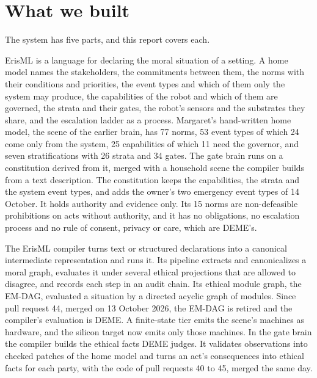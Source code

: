 \section{What we built}

The system has five parts, and this report covers each.

ErisML is a language for declaring the moral situation of a setting. A home model names the
stakeholders, the commitments between them, the norms with their conditions and priorities, the event
types and which of them only the system may produce, the capabilities of the robot and which of
them are governed, the strata and their gates, the robot's sensors and the substrates they share,
and the escalation ladder as a process. Margaret's hand-written home model, the scene of the
earlier brain, has 77 norms, 53 event types of which 24 come only from the system, 25 capabilities
of which 11 need the governor, and seven stratifications with 26 strata and 34 gates. The gate
brain runs on a constitution derived from it, merged with a household scene the compiler builds
from a text description. The constitution keeps the capabilities, the strata and the system event
types, and adds the owner's two emergency event types of 14 October. It holds authority and
evidence only. Its 15 norms are non-defeasible prohibitions on acts without authority, and it has
no obligations, no escalation process and no rule of consent, privacy or care, which are DEME's.

The ErisML compiler turns text or structured declarations into a canonical intermediate
representation and runs it. Its pipeline extracts and canonicalizes a moral graph, evaluates it
under several ethical projections that are allowed to disagree, and records each step in an audit
chain. Its ethical module graph, the EM-DAG, evaluated a situation by a directed acyclic graph of
modules. Since pull request 44, merged on 13 October 2026, the EM-DAG is retired and the
compiler's evaluation is DEME. A finite-state tier emits the scene's machines as hardware, and the
silicon target now emits only those machines. In the gate brain the compiler builds the ethical
facts DEME judges. It validates observations into checked patches of the home model and turns an
act's consequences into ethical facts for each party, with the code of pull requests 40 to 45,
merged the same day.

